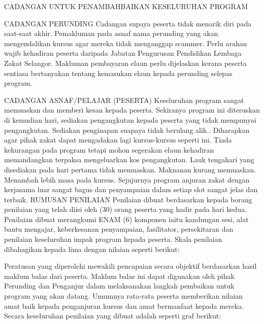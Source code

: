 CADANGAN UNTUK PENAMBAHBAIKAN KESELURUHAN PROGRAM

CADANGAN PERUNDING
Cadangan supaya peserta tidak menarik diri pada saat-saat akhir.
Pemakluman pada asnaf nama perunding yang akan mengendalikan kursus agar mereka tidak menganggap scammer.
Perlu arahan wajib kehadiran peserta daripada Jabatan Pengurusan Pendidikan Lembaga Zakat Selangor.
Makluman pembayaran elaun perlu dijelaskan kerana peserta sentiasa bertanyakan tentang kemasukan elaun kepada perunding selepas program.


CADANGAN ASNAF/PELAJAR (PESERTA)
Keseluruhan program sangat memuaskan dan memberi kesan kepada peserta.
Sekiranya program ini diteruskan di kemudian hari, sediakan pengangkutan kepada peserta yang tidak mempunyai pengangkutan.
Sediakan penginapan suapaya tidak berulang alik..
Diharapkan agar pihak zakat dapat mengadakan lagi kursus-kursus seperti ini.
Tiada kekurangan pada program tetapi mohon segerakan elaun kehadiran memandangkan terpaksa mengeluarkan kos pengangkutan.
Lauk tengahari yang disediakan pada hari pertama tidak memuaskan.
Maknanan kurang memuaskan.
Menambah lebih masa pada kursus.
Sejujurnya program anjuran zakat dengan kerjasama luar sangat bagus dan penyampaian dalam setiap slot sangat jelas dan terbaik.
RUMUSAN PENILAIAN
Penilaian dibuat berdasarkan kepada borang penilaian yang telah diisi oleh (30) orang peserta yang hadir pada hari kedua. Penilaian dibuat merangkumi ENAM (6) komponen iaitu kandungan sesi, alat bantu mengajar, keberkesanan penyampaian, fasilitator, persekitaran dan penilaian keseluruhan impak program kepada peserta. Skala penilaian dibahagikan kepada lima dengan nilaian seperti berikut:

Peratusan yang diperolehi mewakili pencapaian secara objektif berdasarkan hasil maklum balas dari peserta. Maklum balas ini dapat digunakan oleh pihak Perunding dan Penganjur dalam melaksanakan langkah pembaikan untuk program yang akan datang. Umumnya rata-rata peserta memberikan nilaian amat baik kepada penganjuran kursus dan amat bermanfaat kepada mereka. Secara keseluruhan penilaian yang dibuat adalah seperti graf berikut:


























